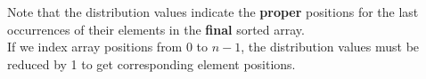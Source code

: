 \documentclass[preview]{standalone}
\begin{document}
\begin{center}
Note that the distribution values indicate the \textbf{proper} positions for the last occurrences of their elements in the \textbf{final} sorted array.\\ If we index array positions from 0 to $n - 1$, the distribution values must be reduced by 1 to get corresponding element positions.
\end{center}
\end{document}
